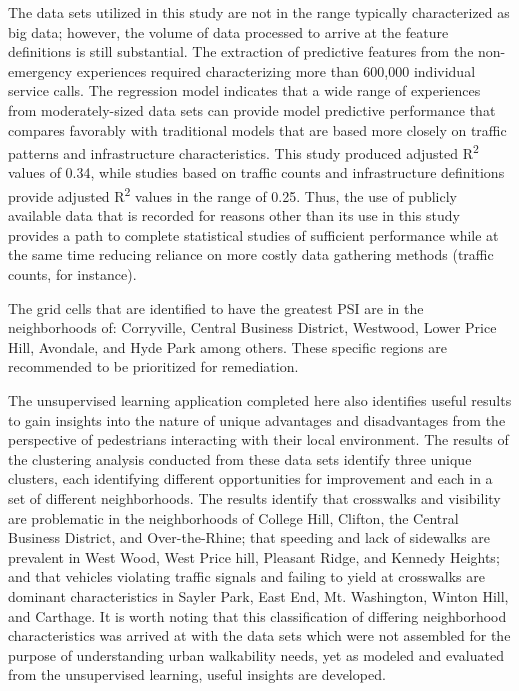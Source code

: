 \documentclass{llncs}
\begin{document}
The data sets utilized in this study are not in the range typically characterized as big data; however, the volume of data processed to arrive at the feature definitions is still substantial.  The extraction of predictive features from the non-emergency experiences required characterizing more than 600,000 individual service calls. The regression model indicates that a wide range of experiences from moderately-sized data sets can provide model predictive performance that compares favorably with traditional models that are based more closely on traffic patterns and infrastructure characteristics. This study produced adjusted R\textsuperscript{2} values of 0.34, while studies based on traffic counts and infrastructure definitions provide adjusted R\textsuperscript{2} values in the range of 0.25. Thus, the use of publicly available data that is recorded for reasons other than its use in this study provides a path to complete statistical studies of sufficient performance while at the same time reducing reliance on more costly data gathering methods (traffic counts, for instance).

The grid cells that are identified to have the greatest PSI are in the neighborhoods of: Corryville, Central Business District, Westwood, Lower Price Hill, Avondale, and Hyde Park among others. These specific regions are recommended to be prioritized for remediation.

The unsupervised learning application completed here also identifies useful results to gain insights into the nature of unique advantages and disadvantages from the perspective of pedestrians interacting with their local environment. The results of the clustering analysis conducted from these data sets identify three unique clusters, each identifying different opportunities for improvement and each in a set of different neighborhoods. The results identify that crosswalks and visibility are problematic in the neighborhoods of  College Hill, Clifton, the Central Business District, and Over-the-Rhine; that speeding and lack of sidewalks are prevalent in  West Wood, West Price hill, Pleasant Ridge, and Kennedy Heights; and that vehicles violating traffic signals and failing to yield at crosswalks are dominant characteristics in  Sayler Park, East End, Mt. Washington, Winton Hill, and Carthage. It is worth noting that this classification of differing neighborhood characteristics was arrived at with the data sets which were not assembled for the purpose of understanding urban walkability needs, yet as modeled and evaluated from the unsupervised learning, useful insights are developed.
\end{document}
